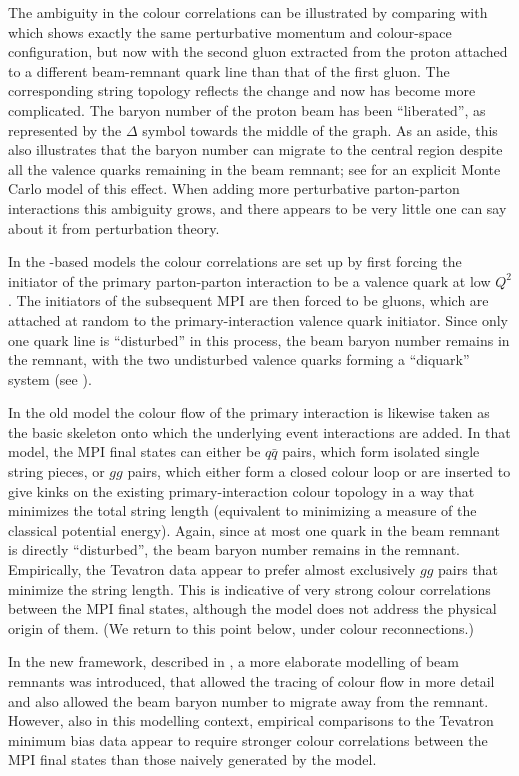 The ambiguity in the colour correlations can be illustrated by
comparing with  which shows exactly the same
perturbative momentum and colour-space configuration, but now with the
second gluon extracted from the proton attached to a different
beam-remnant quark line than that of the first gluon. The
corresponding string topology reflects the change and now has become
more complicated.
The baryon number of the proton beam has been ``liberated'', as represented by
the $\Delta$ symbol towards the middle of the graph. As an aside, this
also illustrates that the baryon number can migrate to the central
region despite all the valence quarks remaining in the beam
remnant; see \cite{Sjostrand:2004pf} for an explicit Monte Carlo model of this effect.
When adding more perturbative parton-parton interactions
this ambiguity grows, and there appears to be very little one can say
about it from perturbation theory.

In the \herwig-based models the colour correlations are set up
by first forcing the initiator of the primary parton-parton
interaction to be a valence quark at low $Q^2$. The initiators of the
subsequent MPI are then forced to be gluons,
which are attached at random to the primary-interaction valence quark
initiator. Since only one quark line is ``disturbed'' in this process,
the beam baryon number remains in the remnant, with the two
undisturbed valence quarks forming a ``diquark'' system
(see ).

In the old \pythia model the colour flow of the primary
interaction is likewise taken as the basic skeleton onto which the
underlying event interactions are added. In that model, the MPI
final states can either be $q\bar{q}$ pairs, which form isolated
single string pieces, or $gg$ pairs, which either form a closed colour
loop or are inserted to give kinks on the existing primary-interaction
colour topology in a way that minimizes the total string length
(equivalent to minimizing a measure
of the classical potential energy). Again, since at most one quark in
the beam remnant is directly ``disturbed'', the beam baryon number
remains in the remnant. Empirically, the Tevatron data
appear to prefer almost exclusively $gg$ pairs that
minimize the string length. This is indicative of very strong colour
correlations between the MPI final states, although the model does not
address the physical origin of them. (We return to this point
below, under colour reconnections.)

In the new \pythia framework, described in \cite{Sjostrand:2004pf},
a more elaborate modelling of beam remnants was introduced, that
allowed the tracing of colour flow in more detail and also allowed
the beam baryon number to migrate away from the remnant. However,
also in this modelling context, empirical comparisons to the Tevatron
minimum bias data appear to require stronger colour correlations
between the MPI final states than those naively generated by the
model.

